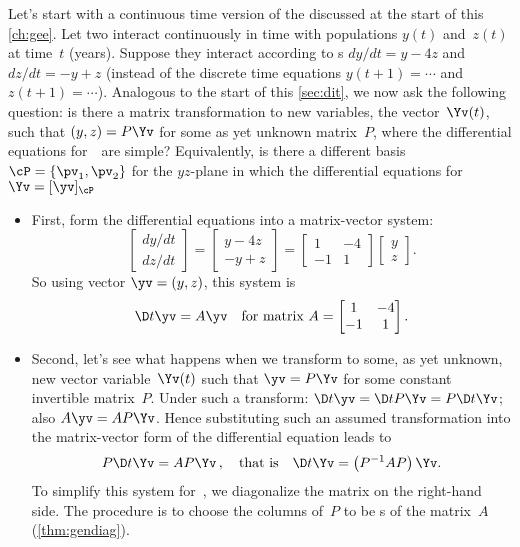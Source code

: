 Let's start with a continuous time version of the  discussed at the start of this \cref{ch:gee}.
Let two  interact continuously in time with populations \(y(t)\) and~\(z(t)\) at time~\(t\) (years).
Suppose they interact according to s \(dy/dt=y-4z\) and \(dz/dt=-y+z\) (instead of the discrete time equations \(y(t+1)=\cdots\) and \(z(t+1)=\cdots\)).
Analogous to the start of this \cref{sec:dit}, we now ask the following question: is there a matrix transformation to new variables, the vector~\(\Yv(t)\), such that \((y,z)=P\Yv\) for some as yet unknown matrix~\(P\), where the differential equations for~\Yv\ are simple?
Equivalently, is there a different basis \(\cP=\{\pv_1,\pv_2\}\) for the \(yz\)-plane in which the differential equations for \(\Yv=[\yv]_\cP\) 
\begin{itemize}
\item First, form the differential equations into a matrix-vector system:
\begin{equation*}
\begin{bmatrix} dy/dt\\dz/dt \end{bmatrix}
=\begin{bmatrix} y-4z
\\ -y+z \end{bmatrix}
=\begin{bmatrix} 1&-4\\-1& 1 \end{bmatrix}\begin{bmatrix} y\\z \end{bmatrix}.
\end{equation*}
So using vector \(\yv=(y,z)\), this system is
\begin{equation*}
\D t\yv=A\yv
\quad\text{for matrix }A=\begin{bmatrix} 1&-4\\-1& 1 \end{bmatrix}.
\end{equation*}

\item Second, let's see what happens when we transform to some, as yet unknown, new vector variable~\(\Yv(t)\) such that \(\yv=P\Yv\) for some constant invertible matrix~\(P\).
Under such a transform: \(\D t\yv=\D t{}P\Yv=P\D t\Yv\); also \(A\yv=AP\Yv\).
Hence substituting such an assumed transformation into the matrix-vector form of the differential equation leads to
\begin{equation*}
P\D t\Yv=AP\Yv\,, 
\quad\text{that is}\quad
\D t\Yv=\left(P^{-1}AP\right)\Yv.
\end{equation*}
To simplify this system for~\Yv, we diagonalize the matrix on the right-hand side.
The procedure is to choose the columns of~\(P\) to be s of the matrix~\(A\) (\cref{thm:gendiag}).


\end{itemize}
